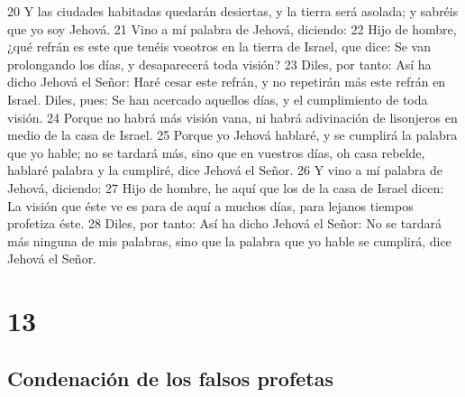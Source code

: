 20 Y las ciudades habitadas quedarán desiertas, y la tierra será asolada; y sabréis que yo soy Jehová.
21 Vino a mí palabra de Jehová, diciendo:
22 Hijo de hombre, ¿qué refrán es este que tenéis vosotros en la tierra de Israel, que dice: Se van prolongando los días, y desaparecerá toda visión?
23 Diles, por tanto: Así ha dicho Jehová el Señor: Haré cesar este refrán, y no repetirán más este refrán en Israel. Diles, pues: Se han acercado aquellos días, y el cumplimiento de toda visión.
24 Porque no habrá más visión vana, ni habrá adivinación de lisonjeros en medio de la casa de Israel.
25 Porque yo Jehová hablaré, y se cumplirá la palabra que yo hable; no se tardará más, sino que en vuestros días, oh casa rebelde, hablaré palabra y la cumpliré, dice Jehová el Señor.
26 Y vino a mí palabra de Jehová, diciendo:
27 Hijo de hombre, he aquí que los de la casa de Israel dicen: La visión que éste ve es para de aquí a muchos días, para lejanos tiempos profetiza éste.
28 Diles, por tanto: Así ha dicho Jehová el Señor: No se tardará más ninguna de mis palabras, sino que la palabra que yo hable se cumplirá, dice Jehová el Señor.

\chapter{13}

\section*{Condenación de los falsos profetas}

